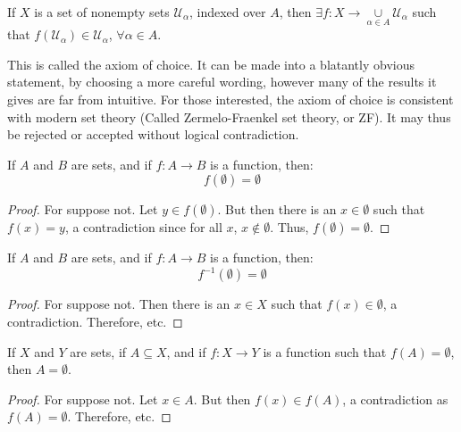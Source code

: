 \documentclass[crop=false,class=book,oneside]{standalone}
\begin{document}
        \begin{axiom}
            If $X$ is a set of nonempty sets $\mathcal{U}_{\alpha}$,
            indexed over $A$, then
            $\exists f:X\rightarrow \underset{\alpha \in A}\cup \mathcal{U}_{\alpha}$
            such that $f(\mathcal{U}_{\alpha})\in\mathcal{U}_{\alpha}$, $\forall\alpha\in A$.
        \end{axiom}
        This is called the axiom of choice. It can be made into a blatantly
        obvious statement, by choosing a more careful wording,
        however many of the results it gives are far from intuitive.
        For those interested, the axiom of choice is consistent with
        modern set theory (Called Zermelo-Fraenkel set theory, or ZF).
        It may thus be rejected or accepted without logical contradiction.
        \begin{theorem}
            If $A$ and $B$ are sets, and if $f:A\rightarrow{B}$ is a function, then:
            \begin{equation}
                f(\emptyset)=\emptyset
            \end{equation}
        \end{theorem}
        \begin{proof}
            For suppose not. Let $y\in{f}(\emptyset)$. But then there is an
            $x\in\emptyset$ such that $f(x)=y$, a contradiction since for all
            $x$, $x\notin\emptyset$. Thus, $f(\emptyset)=\emptyset$.
        \end{proof}
        \begin{theorem}
            If $A$ and $B$ are sets, and if $f:A\rightarrow{B}$ is a function, then:
            \begin{equation}
                f^{-1}(\emptyset)=\emptyset
            \end{equation}
        \end{theorem}
        \begin{proof}
            For suppose not. Then there is an $x\in{X}$ such that
            $f(x)\in\emptyset$, a contradiction. Therefore, etc.
        \end{proof}
        \begin{theorem}
            If $X$ and $Y$ are sets, if $A\subseteq{X}$, and if
            $f:X\rightarrow{Y}$ is a function such that
            $f(A)=\emptyset$, then $A=\emptyset$.
        \end{theorem}
        \begin{proof}
            For suppose not. Let $x\in{A}$. But then
            $f(x)\in{f}(A)$, a contradiction as
            $f(A)=\emptyset$. Therefore, etc.
        \end{proof}
\end{document}
